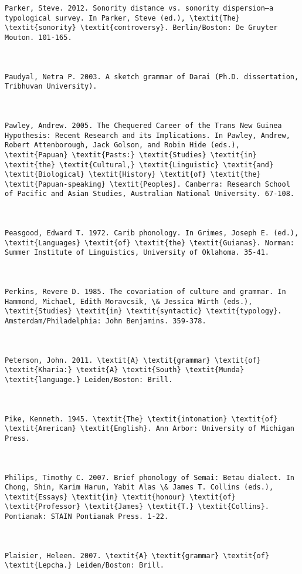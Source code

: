 \begin{verbatim}
Parker, Steve. 2012. Sonority distance vs. sonority dispersion–a typological survey. In Parker, Steve (ed.), \textit{The} \textit{sonority} \textit{controversy}. Berlin/Boston: De Gruyter Mouton. 101-165.



Paudyal, Netra P. 2003. A sketch grammar of Darai (Ph.D. dissertation, Tribhuvan University).



Pawley, Andrew. 2005. The Chequered Career of the Trans New Guinea Hypothesis: Recent Research and its Implications. In Pawley, Andrew, Robert Attenborough, Jack Golson, and Robin Hide (eds.), \textit{Papuan} \textit{Pasts:} \textit{Studies} \textit{in} \textit{the} \textit{Cultural,} \textit{Linguistic} \textit{and} \textit{Biological} \textit{History} \textit{of} \textit{the} \textit{Papuan-speaking} \textit{Peoples}. Canberra: Research School of Pacific and Asian Studies, Australian National University. 67-108.



Peasgood, Edward T. 1972. Carib phonology. In Grimes, Joseph E. (ed.), \textit{Languages} \textit{of} \textit{the} \textit{Guianas}. Norman: Summer Institute of Linguistics, University of Oklahoma. 35-41.



Perkins, Revere D. 1985. The covariation of culture and grammar. In Hammond, Michael, Edith Moravcsik, \& Jessica Wirth (eds.), \textit{Studies} \textit{in} \textit{syntactic} \textit{typology}. Amsterdam/Philadelphia: John Benjamins. 359-378.



Peterson, John. 2011. \textit{A} \textit{grammar} \textit{of} \textit{Kharia:} \textit{A} \textit{South} \textit{Munda} \textit{language.} Leiden/Boston: Brill.



Pike, Kenneth. 1945. \textit{The} \textit{intonation} \textit{of} \textit{American} \textit{English}. Ann Arbor: University of Michigan Press.



Philips, Timothy C. 2007. Brief phonology of Semai: Betau dialect. In Chong, Shin, Karim Harun, Yabit Alas \& James T. Collins (eds.), \textit{Essays} \textit{in} \textit{honour} \textit{of} \textit{Professor} \textit{James} \textit{T.} \textit{Collins}. Pontianak: STAIN Pontianak Press. 1-22.



Plaisier, Heleen. 2007. \textit{A} \textit{grammar} \textit{of} \textit{Lepcha.} Leiden/Boston: Brill.




\end{verbatim}
